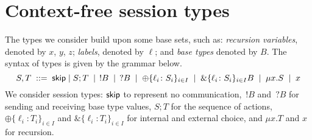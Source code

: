 \section{Context-free session types}
\label{sec:contextfreesession}

The types we consider build upon some base sets, such as:
\emph{recursion variables}, denoted by $x$, $y$, $z$;
\emph{labels}, denoted by $\ell$; and \emph{base types} denoted by
$B$.  The syntax of types is given by the grammar below.%
%
\begin{equation*}
    S,T \; ::= \; \mathsf{skip} \mid S;T \;\mid\; \,!B \;\mid\; \,?B \;\mid\; 
       \oplus\{\ell_i\colon S_i\}_{i\in I} \;\mid\; \&\{\ell_i\colon S_i\}_{i\in I} B \;\mid\;
       \mu x.S \;\mid\; x
\end{equation*}
We consider session types: $\mathsf{skip}$ to represent no communication,
$\,!B$ and $\,?B$ for sending and receiving base type values,
$S;T$ for the sequence of actions,
$\oplus\{\ell_i\colon T_i\}_{i\in I}$ and
$\&\{\ell_i\colon T_i\}_{i\in I}$ for internal and external choice,
and $\mu x.T$ and $x$ for recursion.


